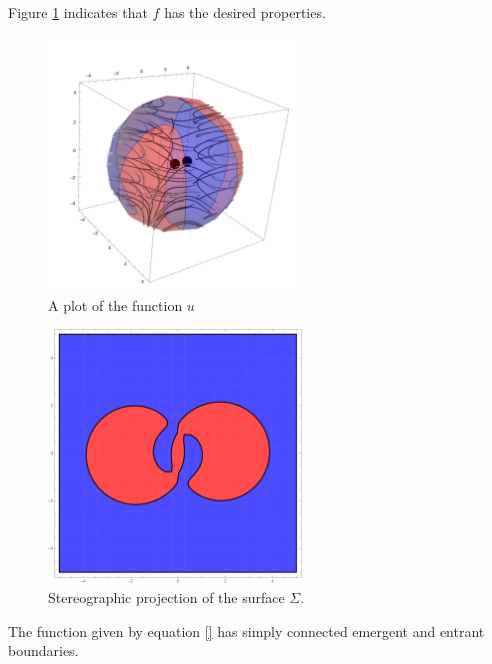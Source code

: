 \begin{example}
  Figure \ref{pl:n3_hf_inflowOutflowStagnationPoint_overview}
  indicates that $f$ has the desired properties.
  \begin{figure}
    \centering
    \includegraphics[width=0.6\textwidth]{../plots/n3_hf_inflowOutflow_Ball_overview.pdf}
    \caption{A plot of the function $u$}
    \label{pl:n3_hf_inflowOutflowStagnationPoint_overview}
  \end{figure}
  \begin{figure}
    \centering
    \includegraphics[width=0.6\textwidth]{../plots/n3_hf_inflowOutflow_Ball_Surface.pdf}
    \caption{Stereographic projection of the surface $\Sigma$.}
    \label{pl:n3_hf_inflowOutflowStagnationPoint_Surface}
  \end{figure}
\end{example}
\begin{proposition}
  The function given by equation \eqref{} has simply connected emergent and entrant boundaries.
\end{proposition}
